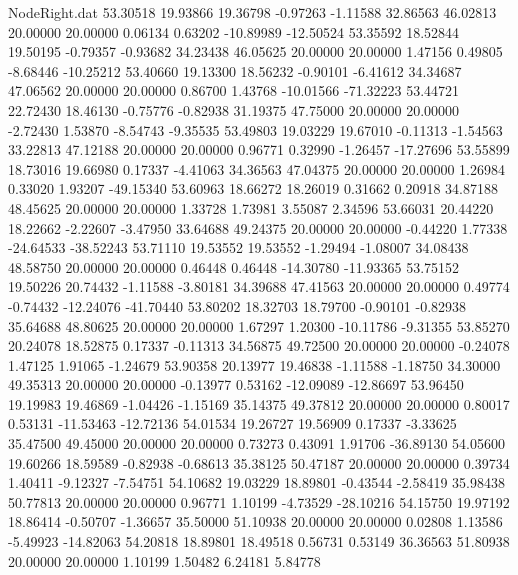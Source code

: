 \begin{filecontents}{NodeRight.dat}
  53.30518   19.93866   19.36798    -0.97263   -1.11588   32.86563   46.02813   20.00000   20.00000    0.06134    0.63202  -10.89989  -12.50524
  53.35592   18.52844   19.50195    -0.79357   -0.93682   34.23438   46.05625   20.00000   20.00000    1.47156    0.49805   -8.68446  -10.25212
  53.40660   19.13300   18.56232    -0.90101   -6.41612   34.34687   47.06562   20.00000   20.00000    0.86700    1.43768  -10.01566  -71.32223
  53.44721   22.72430   18.46130    -0.75776   -0.82938   31.19375   47.75000   20.00000   20.00000   -2.72430    1.53870   -8.54743   -9.35535
  53.49803   19.03229   19.67010    -0.11313   -1.54563   33.22813   47.12188   20.00000   20.00000    0.96771    0.32990   -1.26457  -17.27696
  53.55899   18.73016   19.66980     0.17337   -4.41063   34.36563   47.04375   20.00000   20.00000    1.26984    0.33020    1.93207  -49.15340
  53.60963   18.66272   18.26019     0.31662    0.20918   34.87188   48.45625   20.00000   20.00000    1.33728    1.73981    3.55087    2.34596
  53.66031   20.44220   18.22662    -2.22607   -3.47950   33.64688   49.24375   20.00000   20.00000   -0.44220    1.77338  -24.64533  -38.52243
  53.71110   19.53552   19.53552    -1.29494   -1.08007   34.08438   48.58750   20.00000   20.00000    0.46448    0.46448  -14.30780  -11.93365
  53.75152   19.50226   20.74432    -1.11588   -3.80181   34.39688   47.41563   20.00000   20.00000    0.49774   -0.74432  -12.24076  -41.70440
  53.80202   18.32703   18.79700    -0.90101   -0.82938   35.64688   48.80625   20.00000   20.00000    1.67297    1.20300  -10.11786   -9.31355
  53.85270   20.24078   18.52875     0.17337   -0.11313   34.56875   49.72500   20.00000   20.00000   -0.24078    1.47125    1.91065   -1.24679
  53.90358   20.13977   19.46838    -1.11588   -1.18750   34.30000   49.35313   20.00000   20.00000   -0.13977    0.53162  -12.09089  -12.86697
  53.96450   19.19983   19.46869    -1.04426   -1.15169   35.14375   49.37812   20.00000   20.00000    0.80017    0.53131  -11.53463  -12.72136
  54.01534   19.26727   19.56909     0.17337   -3.33625   35.47500   49.45000   20.00000   20.00000    0.73273    0.43091    1.91706  -36.89130
  54.05600   19.60266   18.59589    -0.82938   -0.68613   35.38125   50.47187   20.00000   20.00000    0.39734    1.40411   -9.12327   -7.54751
  54.10682   19.03229   18.89801    -0.43544   -2.58419   35.98438   50.77813   20.00000   20.00000    0.96771    1.10199   -4.73529  -28.10216
  54.15750   19.97192   18.86414    -0.50707   -1.36657   35.50000   51.10938   20.00000   20.00000    0.02808    1.13586   -5.49923  -14.82063
  54.20818   18.89801   18.49518     0.56731    0.53149   36.36563   51.80938   20.00000   20.00000    1.10199    1.50482    6.24181    5.84778

\end{filecontents}
